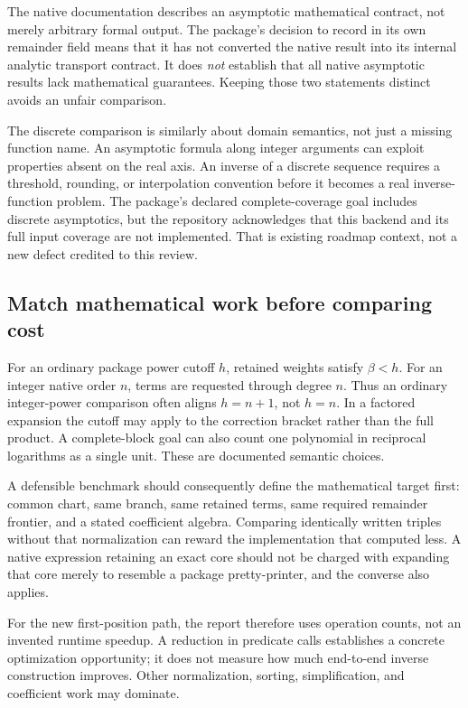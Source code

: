 \documentclass[11pt,letterpaper]{article}
\newcommand{\code}[1]{\texttt{\detokenize{#1}}}
\begin{document}
The native \code{Asymptotic} documentation describes an asymptotic mathematical contract, not merely arbitrary formal output. The package's decision to record \code{Missing["NativeContract"]} in its own remainder field means that it has not converted the native result into its internal analytic transport contract. It does \emph{not} establish that all native asymptotic results lack mathematical guarantees. Keeping those two statements distinct avoids an unfair comparison.~\cite{wlasymptotic,nativecontracts}

The discrete comparison is similarly about domain semantics, not just a missing function name. An asymptotic formula along integer arguments can exploit properties absent on the real axis. An inverse of a discrete sequence requires a threshold, rounding, or interpolation convention before it becomes a real inverse-function problem. The package's declared complete-coverage goal includes discrete asymptotics, but the repository acknowledges that this backend and its full input coverage are not implemented. That is existing roadmap context, not a new defect credited to this review.~\cite{wldiscrete,readme}

\subsection{Match mathematical work before comparing cost}

For an ordinary package power cutoff $h$, retained weights satisfy $\beta<h$. For an integer native \code{Series} order $n$, terms are requested through degree $n$. Thus an ordinary integer-power comparison often aligns $h=n+1$, not $h=n$. In a factored expansion the cutoff may apply to the correction bracket rather than the full product. A complete-block goal can also count one polynomial in reciprocal logarithms as a single unit. These are documented semantic choices.~\cite{readme,wlseries}

A defensible benchmark should consequently define the mathematical target first: common chart, same branch, same retained terms, same required remainder frontier, and a stated coefficient algebra. Comparing identically written triples without that normalization can reward the implementation that computed less. A native expression retaining an exact core should not be charged with expanding that core merely to resemble a package pretty-printer, and the converse also applies.

For the new first-position path, the report therefore uses operation counts, not an invented runtime speedup. A reduction in predicate calls establishes a concrete optimization opportunity; it does not measure how much end-to-end inverse construction improves. Other normalization, sorting, simplification, and coefficient work may dominate.
\end{document}
